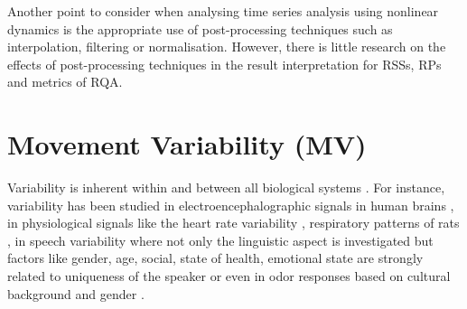 Another point to consider when analysing time series analysis using 
nonlinear dynamics is the appropriate use of post-processing techniques 
such as interpolation, filtering or normalisation.
However, there is little research on the effects of post-processing 
techniques in the result interpretation for  RSSs, RPs and metrics of RQA.

%






\section{Movement Variability (MV)}
Variability is inherent within and between all biological 
systems \citep{newell1993}.
For instance, variability has been studied in electroencephalographic 
signals in human brains \citep{klonowski2007}, in physiological signals 
like the heart rate variability \citep{schumacher2004, acharya2006}, 
respiratory patterns of rats \citep{dhingra2011}, in speech variability 
where not only the linguistic aspect is investigated but 
factors like gender, age, social, state of health, emotional state are
strongly related to uniqueness of the speaker \citep{benzeghiba2007}
or even in odor responses based on cultural background and 
gender \citep{ferdenzi2013}.

